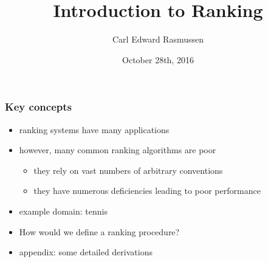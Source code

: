 

\title{Introduction to Ranking}
\author{Carl Edward Rasmussen}
\date{October 28th, 2016}




\begin{frame}
\titlepage
\end{frame}


\begin{frame}
\frametitle{Key concepts}

\begin{itemize}
\item ranking systems have many applications 
\item however, many common ranking algorithms are poor
\begin{itemize}
\item they rely on vast numbers of arbitrary conventions
\item they have numerous deficiencies leading to poor performance
\end{itemize}
\item example domain: tennis
\item How would we define a  ranking procedure?
\item appendix: some detailed derivations 
\end{itemize}
\end{frame}


